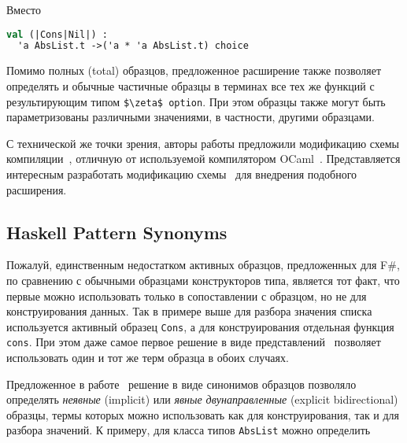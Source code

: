 Вместо

\noindent
\begin{minipage}{\linewidth}
\begin{lstlisting}[language=ocaml]
val (|Cons|Nil|) : 
  'a AbsList.t ->('a * 'a AbsList.t) choice
\end{lstlisting}
\end{minipage}

Помимо полных (total) образцов, предложенное расширение также позволяет определять и обычные частичные образцы в терминах все тех же функций с результирующим типом \lstinline[breaklines]|$\zeta$ option|. При этом образцы также могут быть параметризованы различными значениями, в частности, другими образцами.

С технической же точки зрения, авторы работы предложили модификацию схемы компиляции~\cite{scott2000whendo}, отличную от используемой компилятором OCaml~\cite{fessant2001optimizing}. Представляется интересным разработать модификацию схемы~\cite{fessant2001optimizing} для внедрения подобного расширения.

\subsection{Haskell Pattern Synonyms}
Пожалуй, единственным недостатком активных образцов, предложенных для F\#, по сравнению с обычными образцами конструкторов типа, является тот факт, что первые можно использовать только в сопоставлении с образцом, но не для конструирования данных. Так в примере выше для разбора значения списка используется активный образец \lstinline|Cons|, а для конструирования отдельная функция \lstinline|cons|. При этом даже самое первое решение в виде представлений~\cite{wadler1987views} позволяет использовать один и тот же терм образца в обоих случаях.

Предложенное в работе~\cite{pickering2016pattern} решение в виде синонимов образцов позволяло определять \textit{неявные} (implicit) или \textit{явные двунаправленные} (expli\-cit bidirectional) образцы, термы которых можно использовать как для конструирования, так и для разбора значений. К примеру, для класса типов \lstinline|AbsList| можно определить


